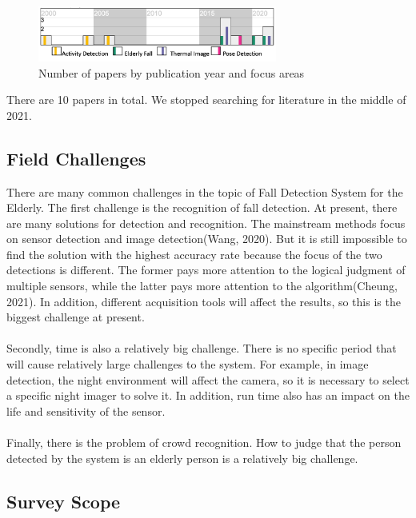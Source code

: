 \documentclass[12pt]{article}
\begin{document}
\begin{figure}[H]
\centering
\includegraphics[width=0.7\textwidth]{supplementary-figure.png}
\caption{Number of papers by publication year and focus areas} 
\end{figure}

\noindent There are 10 papers in total. We stopped searching for literature in the middle of 2021.

\subsection{Field Challenges}

There are many common challenges in the topic of Fall Detection System for the Elderly. The first challenge is the recognition of fall detection. At present, there are many solutions for detection and recognition. The mainstream methods focus on sensor detection and image detection(Wang, 2020). But it is still impossible to find the solution with the highest accuracy rate because the focus of the two detections is different. The former pays more attention to the logical judgment of multiple sensors, while the latter pays more attention to the algorithm(Cheung, 2021). In addition, different acquisition tools will affect the results, so this is the biggest challenge at present.
\\ \hspace*{\fill} \\
Secondly, time is also a relatively big challenge. There is no specific period that will cause relatively large challenges to the system. For example, in image detection, the night environment will affect the camera, so it is necessary to select a specific night imager to solve it. In addition, run time also has an impact on the life and sensitivity of the sensor.
\\ \hspace*{\fill} \\
Finally, there is the problem of crowd recognition. How to judge that the person detected by the system is an elderly person is a relatively big challenge.

\subsection{Survey Scope}
\end{document}
